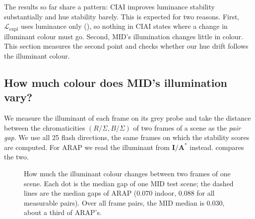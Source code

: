 The results so far share a pattern: CIAI improves luminance stability substantially and hue
stability barely. This is expected for two reasons. First, $\mathcal{L}_{\text{expl}}$ uses
luminance only (), so nothing in CIAI states where a change in illuminant
colour must go. Second, MID's illumination changes little in colour. This section measures
the second point and checks whether our hue drift follows the illuminant colour.

\subsection{How much colour does MID's illumination vary?}

We measure the illuminant of each frame on its grey probe and take the distance between
the chromaticities $(R/\Sigma, B/\Sigma)$ of two frames of a scene as the \emph{pair gap}.
We use all 25 flash directions, the same frames on which the stability scores are computed.
For ARAP we read the illuminant from $\mathbf{I}/\mathbf{A}^*$ instead.
 compares the two.

\begin{figure}[t!]
  \centering
  \caption[Illuminant colour change in MID and ARAP.]{%
    How much the illuminant colour changes between two frames of one scene. Each dot is
    the median gap of one MID test scene; the dashed lines are the median gaps of ARAP
    (0.070 indoor, 0.088 for all measurable pairs). Over all frame pairs, the MID median is
    0.030, about a third of ARAP's.
  }
  \label{fig:pair_gaps}
\end{figure}

